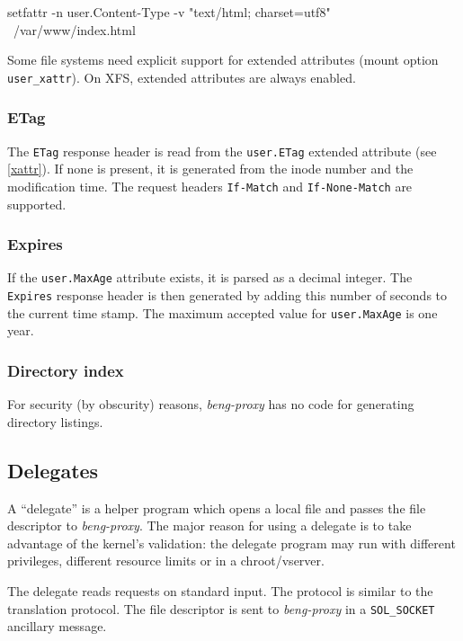 \documentclass[a4paper,12pt]{article}
\begin{document}
\begin{verbatim*}
setfattr -n user.Content-Type -v "text/html; charset=utf8" \
/var/www/index.html
\end{verbatim*}

Some file systems need explicit support for extended attributes (mount
option \texttt{user\_xattr}).  On
XFS, extended attributes are always enabled.

\subsubsection{ETag}

The \texttt{ETag} response header is read from the \texttt{user.ETag}
extended attribute (see \ref{xattr}).  If none is present, it is
generated from the inode number and the modification time.  The request
headers \texttt{If-Match} and \texttt{If-None-Match} are supported.

\subsubsection{Expires}

If the \texttt{user.MaxAge} attribute exists, it is parsed as a
decimal integer.  The \texttt{Expires} response header is then
generated by adding this number of seconds to the current time stamp.
The maximum accepted value for \texttt{user.MaxAge} is one year.

\subsubsection{Directory index}

For security (by obscurity) reasons, \emph{beng-proxy} has no code for
generating directory listings.

\subsection{Delegates}
\label{delegate}

A ``delegate'' is a helper program which opens a local file and passes
the file descriptor to \emph{beng-proxy}.  The major reason for using
a delegate is to take advantage of the kernel's validation: the
delegate program may run with different privileges, different resource
limits or in a chroot/vserver.

The delegate reads requests on standard input.  The protocol is
similar to the translation protocol.  The file descriptor is sent to
\emph{beng-proxy} in a \texttt{SOL\_SOCKET} ancillary message.
\end{document}
